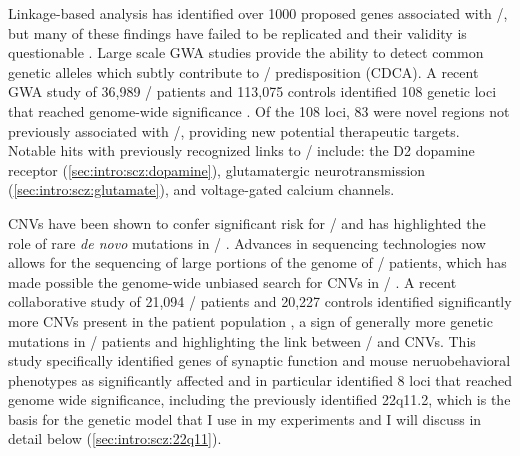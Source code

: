 Linkage-based analysis has identified over 1000 proposed genes associated with \scz/, but many of these findings have failed to be replicated and their validity is questionable \citep[\url{http://www.szgene.org},][]{Allen2008}.
Large scale \ac{GWA} studies provide the ability to detect common genetic alleles which subtly contribute to \scz/ predisposition (CDCA).
A recent \ac{GWA} study of 36,989 \scz/ patients and 113,075 controls identified 108 genetic loci that reached genome-wide significance \citep{Ripke2014}.
Of the 108 loci, 83 were novel regions not previously associated with \scz/, providing new potential therapeutic targets.
Notable hits with previously recognized links to \scz/ include: the D2 dopamine receptor (\autoref{sec:intro:scz:dopamine}), glutamatergic neurotransmission (\autoref{sec:intro:scz:glutamate}), and voltage-gated calcium channels.

\acp{CNV} have been shown to confer significant risk for \scz/ and has highlighted the role of rare \textit{de novo} mutations in \scz/ \citep{Rodriguez-Murillo2012}.
Advances in sequencing technologies now allows for the sequencing of large portions of the genome of \scz/ patients, which has made possible the genome-wide unbiased search for \acp{CNV} in \scz/ \citep{Xu2011}.
A recent collaborative study of 21,094 \scz/ patients and 20,227 controls identified significantly more \acp{CNV} present in the patient population \citep{Marshall2016}, a sign of generally more genetic mutations in \scz/ patients and highlighting the link between \scz/ and \acp{CNV}.
This study specifically identified genes of synaptic function and mouse neruobehavioral phenotypes as significantly affected and in particular identified 8 loci that reached genome wide significance, including the previously identified 22q11.2, which is the basis for the genetic model that I use in my experiments and I will discuss in detail below (\autoref{sec:intro:scz:22q11}).


